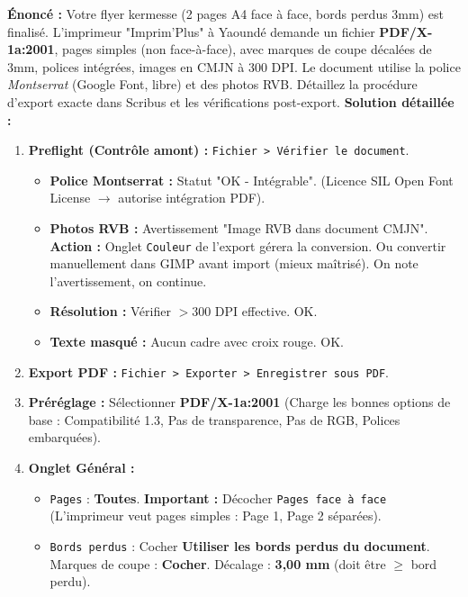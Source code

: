 \documentclass[11pt]{article}
\begin{document}
\begin{exoresolu}
    \textbf{Énoncé :} Votre flyer kermesse (2 pages A4 face à face, bords perdus 3mm) est finalisé. L'imprimeur "Imprim'Plus" à Yaoundé demande un fichier \textbf{PDF/X-1a:2001}, pages simples (non face-à-face), avec marques de coupe décalées de 3mm, polices intégrées, images en CMJN à 300 DPI. Le document utilise la police \textit{Montserrat} (Google Font, libre) et des photos RVB. Détaillez la procédure d'export exacte dans Scribus et les vérifications post-export.
    \tcblower
    \textbf{Solution détaillée :}
    \begin{enumerate}
        \item \textbf{Preflight (Contrôle amont) :} \texttt{Fichier > Vérifier le document}.
              \begin{itemize}
                  \item \textbf{Police Montserrat :} Statut "OK - Intégrable". (Licence SIL Open Font License $\rightarrow$ autorise intégration PDF).
                  \item \textbf{Photos RVB :} Avertissement "Image RVB dans document CMJN". \textbf{Action :} Onglet \texttt{Couleur} de l'export gérera la conversion. Ou convertir manuellement dans GIMP avant import (mieux maîtrisé). On note l'avertissement, on continue.
                  \item \textbf{Résolution :} Vérifier $> 300$ DPI effective. OK.
                  \item \textbf{Texte masqué :} Aucun cadre avec croix rouge. OK.
              \end{itemize}
        \item \textbf{Export PDF :} \texttt{Fichier > Exporter > Enregistrer sous PDF}.
              \item \textbf{Préréglage :} Sélectionner \textbf{PDF/X-1a:2001} (Charge les bonnes options de base : Compatibilité 1.3, Pas de transparence, Pas de RGB, Polices embarquées).
              \item \textbf{Onglet Général :}
                    \begin{itemize}
                        \item \texttt{Pages} : \textbf{Toutes}. \textbf{Important :} Décocher \texttt{Pages face à face} (L'imprimeur veut pages simples : Page 1, Page 2 séparées).
                        \item \texttt{Bords perdus} : Cocher \textbf{Utiliser les bords perdus du document}. Marques de coupe : \textbf{Cocher}. Décalage : \textbf{3,00 mm} (doit être $\ge$ bord perdu).

\end{itemize}
\end{enumerate}
\end{exoresolu}
\end{document}
